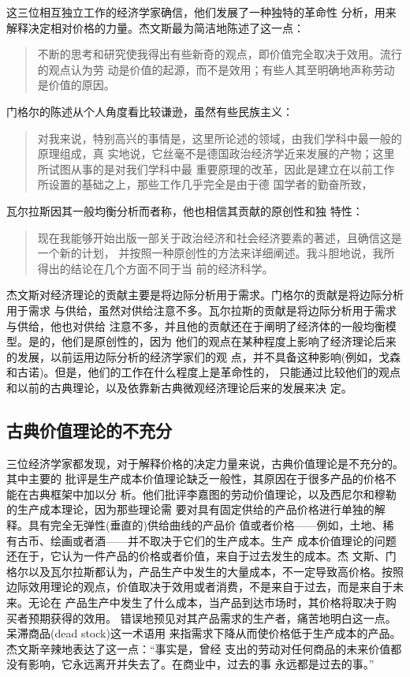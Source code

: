 这三位相互独立工作的经济学家确信，他们发展了一种独特的革命性
分析，用来解释决定相对价格的力量。杰文斯最为简洁地陈述了这一点：
\begin{quotation}
  不断的思考和研究使我得出有些新奇的观点，即价值完全取决于效用。流行的观点认为劳
  动是价值的起源，而不是效用；有些人其至明确地声称劳动是价值的原因。
\end{quotation}

门格尔的陈述从个人角度看比较谦逊，虽然有些民族主义：
\begin{quotation}
  对我来说，特别高兴的事情是，这里所论述的领域，由我们学科中最一般的原理组成，真
  实地说，它丝毫不是德国政治经济学近来发展的产物；这里所试图从事的是对我们学科中最
  重要原理的改革，因此是建立在以前工作所设置的基础之上，那些工作几乎完全是由于德
  国学者的勤奋所致，
\end{quotation}

瓦尔拉斯因其一般均衡分析而者称，他也相信其贡献的原创性和独
特性：
\begin{quotation}
  现在我能够开始出版一部关于政治经济和社会经济要素的著述，且确信这是一个新的计划，
  并按照一种原创性的方法来详细阐述。我斗胆地说，我所得出的结论在几个方面不同于当
  前的经济科学。
\end{quotation}

杰文斯对经济理论的贡献主要是将边际分析用于需求。门格尔的贡献是将边际分析用于需求
与供给，虽然对供给注意不多。瓦尔拉斯的贡献是将边际分析用于需求与供给，他也对供给
注意不多，并且他的贡献还在于阐明了经济体的一般均衡模型。是的，他们是原创性的，因为
他们的观点在某种程度上影响了经济理论后来的发展，以前运用边际分析的经济学家们的观
点，并不具备这种影响(例如，戈森和古诺)。但是，他们的工作在什么程度上是革命性的，
只能通过比较他们的观点和以前的古典理论，以及依靠新古典微观经济理论后来的发展来决
定。

\subsection{古典价值理论的不充分}

三位经济学家都发现，对于解释价格的决定力量来说，古典价值理论是不充分的。其中主要的
批评是生产成本价值理论缺乏一般性，其原因在于很多产品的价格不能在古典框架中加以分
析。他们批评李嘉图的劳动价值理论，以及西尼尔和穆勒的生产成本理论，因为那些理论需
要对具有固定供给的产品价格进行单独的解释。具有完全无弹性(垂直的)供给曲线的产品价
值或者价格——例如，土地、稀有古币、绘画或者酒——并不取决于它们的生产成本。生产
成本价值理论的问题还在于，它认为一件产品的价格或者价值，来自于过去发生的成本。杰
文斯、门格尔以及瓦尔拉斯都认为，产品生产中发生的大量成本，不一定导致高价格。按照
边际效用理论的观点，价值取决于效用或者消费，不是来自于过去，而是来自于未来。无论在
产品生产中发生了什么成本，当产品到达市场时，其价格将取决于购买者预期获得的效用。
错误地预见对其产品需求的生产者，痛苦地明白这一点。呆滞商品(dead stock)这一术语用
来指需求下降从而使价格低于生产成本的产品。杰文斯辛辣地表达了这一点：“事实是，曾经
支出的劳动对任何商品的未来价值都没有影响，它永远离开并失去了。在商业中，过去的事
永远都是过去的事。”

